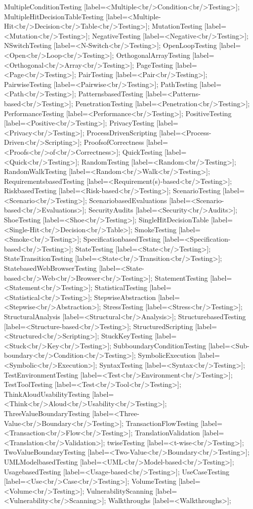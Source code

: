 \documentclass{article}
\begin{document}
{MultipleConditionTesting [label=<Multiple<br/>Condition<br/>Testing>];
MultipleHitDecisionTableTesting [label=<Multiple-Hit<br/>Decision<br/>Table<br/>Testing>];
MutationTesting [label=<Mutation<br/>Testing>];
NegativeTesting [label=<Negative<br/>Testing>];
NSwitchTesting [label=<N-Switch<br/>Testing>];
OpenLoopTesting [label=<Open<br/>Loop<br/>Testing>];
OrthogonalArrayTesting [label=<Orthogonal<br/>Array<br/>Testing>];
PageTesting [label=<Page<br/>Testing>];
PairTesting [label=<Pair<br/>Testing>];
PairwiseTesting [label=<Pairwise<br/>Testing>];
PathTesting [label=<Path<br/>Testing>];
PatternsbasedTesting [label=<Patterns-based<br/>Testing>];
PenetrationTesting [label=<Penetration<br/>Testing>];
PerformanceTesting [label=<Performance<br/>Testing>];
PositiveTesting [label=<Positive<br/>Testing>];
PrivacyTesting [label=<Privacy<br/>Testing>];
ProcessDrivenScripting [label=<Process-Driven<br/>Scripting>];
ProofsofCorrectness [label=<Proofs<br/>of<br/>Correctness>];
QuickTesting [label=<Quick<br/>Testing>];
RandomTesting [label=<Random<br/>Testing>];
RandomWalkTesting [label=<Random<br/>Walk<br/>Testing>];
RequirementsbasedTesting [label=<Requirement(s)-based<br/>Testing>];
RiskbasedTesting [label=<Risk-based<br/>Testing>];
ScenarioTesting [label=<Scenario<br/>Testing>];
ScenariobasedEvaluations [label=<Scenario-based<br/>Evaluations>];
SecurityAudits [label=<Security<br/>Audits>];
ShoeTesting [label=<Shoe<br/>Testing>];
SingleHitDecisionTable [label=<Single-Hit<br/>Decision<br/>Table>];
SmokeTesting [label=<Smoke<br/>Testing>];
SpecificationbasedTesting [label=<Specification-based<br/>Testing>];
StateTesting [label=<State<br/>Testing>];
StateTransitionTesting [label=<State<br/>Transition<br/>Testing>];
StatebasedWebBrowserTesting [label=<State-based<br/>Web<br/>Browser<br/>Testing>];
StatementTesting [label=<Statement<br/>Testing>];
StatisticalTesting [label=<Statistical<br/>Testing>];
StepwiseAbstraction [label=<Stepwise<br/>Abstraction>];
StressTesting [label=<Stress<br/>Testing>];
StructuralAnalysis [label=<Structural<br/>Analysis>];
StructurebasedTesting [label=<Structure-based<br/>Testing>];
StructuredScripting [label=<Structured<br/>Scripting>];
StuckKeyTesting [label=<Stuck<br/>Key<br/>Testing>];
SubboundaryConditionTesting [label=<Sub-boundary<br/>Condition<br/>Testing>];
SymbolicExecution [label=<Symbolic<br/>Execution>];
SyntaxTesting [label=<Syntax<br/>Testing>];
TestEnvironmentTesting [label=<Test<br/>Environment<br/>Testing>];
TestToolTesting [label=<Test<br/>Tool<br/>Testing>];
ThinkAloudUsabilityTesting [label=<Think<br/>Aloud<br/>Usability<br/>Testing>];
ThreeValueBoundaryTesting [label=<Three-Value<br/>Boundary<br/>Testing>];
TransactionFlowTesting [label=<Transaction<br/>Flow<br/>Testing>];
TranslationValidation [label=<Translation<br/>Validation>];
twiseTesting [label=<t-wise<br/>Testing>];
TwoValueBoundaryTesting [label=<Two-Value<br/>Boundary<br/>Testing>];
UMLModelbasedTesting [label=<UML<br/>Model-based<br/>Testing>];
UsagebasedTesting [label=<Usage-based<br/>Testing>];
UseCaseTesting [label=<Use<br/>Case<br/>Testing>];
VolumeTesting [label=<Volume<br/>Testing>];
VulnerabilityScanning [label=<Vulnerability<br/>Scanning>];
Walkthroughs [label=<Walkthroughs>];

}
\end{document}
